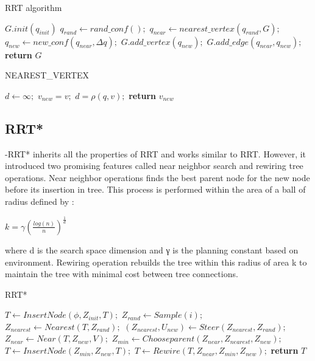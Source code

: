 \documentclass[runningheads]{llncs}
\begin{document}
\begin{algorithm}
\caption{RRT algorithm}\label{RRT}
\begin{algorithmic}[1]
\State $G.init(q_{init})$
\State $q_{rand}\gets rand\_conf();$
\State $q_{near}\gets nearest\_vertex(q_{rand}, G);$
\State $q_{new}\gets new\_conf(q_{near}, \Delta q);$
\State $G.add\_vertex(q_{new});$
\State $G.add\_edge(q_{near},q_{new});$
\EndFor
\State \textbf{return} $G$
\EndProcedure
\end{algorithmic}
\end{algorithm}

\begin{algorithm}
\caption{NEAREST\_VERTEX}\label{RRT}
\begin{algorithmic}[1]
\State $d\gets \infty;$
\State $v_{new} = v;$
\State $d = \rho(q,v);$
\EndIf
\EndFor
\State \textbf{return} $v_{new}$
\EndProcedure
\end{algorithmic}
\end{algorithm}

\vspace{100mm}  
\subsection{RRT*}
-RRT*\cite{IJACSA} inherits all the properties of RRT and works similar to  RRT.  However,  it  introduced  two  promising  features called near  neighbor  search  and rewiring  tree operations.  Near  neighbor  operations finds  the  best  parent  node  for the new node before its insertion in tree. This process is performed within the area of a ball of radius defined by :

\vspace{3mm}

$k = \gamma (\frac{log(n)}{n})^{ \frac{1}{d} } $

\vspace{3mm}

\hspace{-6mm}where d is the search space dimension and γ is the planning constant    based    on    environment. Rewiring operation rebuilds the tree within this radius of area k to maintain the tree with minimal cost between tree connections. 

\begin{algorithm}
\caption{RRT*}\label{RRT*}
\begin{algorithmic}[1]
\State $T\gets InsertNode(\phi,Z_{init},T);$
\State $Z_{rand}\gets Sample(i);$
\State $Z_{nearest}\gets Nearest(T,Z_{rand});$
\State $(Z_{nearest},U_{new} )\gets Steer(Z_{nearest},Z_{rand});$
\State $Z_{near}\gets Near(T,Z_{new},V);$
\State $Z_{min}\gets Chooseparent(Z_{near},Z_{nearest},Z_{new});$
\State $T\gets InsertNode(Z_{min},Z_{new},T);$
\State $T\gets Rewire(T,Z_{near},Z_{min},Z_{new});$
\EndIf
\EndFor
\State\textbf{return} $T$
\EndProcedure
\end{algorithmic}
\end{algorithm}
  
\end{document}
